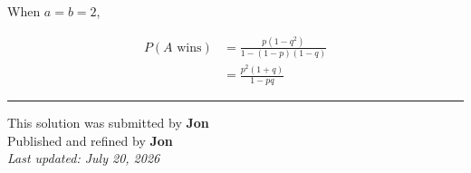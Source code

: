 \documentclass[12pt]{article}
\begin{document}
When $a=b=2$,

\begin{align*}
P(A\text{ wins})
&=\frac{p(1-q^2)}{1-(1-p)(1-q)}\\
&=\frac{p^2(1+q)}{1-pq}
\end{align*}


\bigskip
\hrule
\begin{center}
    This solution was submitted by \textbf{Jon}\\[4pt]
    Published and refined by \textbf{Jon}\\[8pt]
    \textit{Last updated: July 20, 2026}
\end{center}
\end{document}
